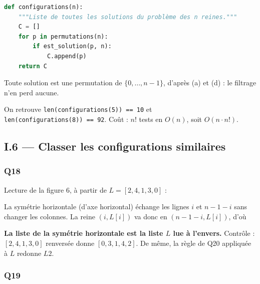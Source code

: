 \documentclass[11pt,a4paper]{article}
\newcommand{\equationajustee}[1]{%
  \sbox{\boiteequation}{$\displaystyle #1$}%
  \ifdim\wd\boiteequation>\linewidth
    \[\resizebox{\linewidth}{!}{\usebox{\boiteequation}}\]%
  \else
    \[#1\]%
  \fi}
\begin{document}
\begin{lstlisting}[language=Python]
def configurations(n):
    """Liste de toutes les solutions du problème des n reines."""
    C = []
    for p in permutations(n):
        if est_solution(p, n):
            C.append(p)
    return C
\end{lstlisting}

Toute solution est une permutation de \(\{0, \dots, n-1\}\), d'après (a) et (d) : le filtrage n'en perd aucune.

On retrouve \texttt{len(\allowbreak{}configurations(\allowbreak{}5)\allowbreak{})\allowbreak{}\ =\allowbreak{}=\allowbreak{}\ 10} et \texttt{len(\allowbreak{}configurations(\allowbreak{}8)\allowbreak{})\allowbreak{}\ =\allowbreak{}=\allowbreak{}\ 92}. Coût : \(n!\) tests en \(O(n)\), soit \(O(n \cdot n!)\).

\hypertarget{i.6-classer-les-configurations-similaires}{%
\subsection{I.6 --- Classer les configurations similaires}\label{i.6-classer-les-configurations-similaires}}

\hypertarget{q18}{%
\subsubsection{Q18}\label{q18}}

Lecture de la figure 6, à partir de \(L = [2, 4, 1, 3, 0]\) :

\equationajustee{\boxed{\begin{aligned}
L1 &= [0, 3, 1, 4, 2] \\
L2 &= [0, 2, 4, 1, 3]
\end{aligned}}}

La symétrie horizontale (d'axe horizontal) échange les lignes \(i\) et \(n - 1 - i\) sans changer les colonnes. La reine \((i, L[i])\) va donc en \((n-1-i, L[i])\), d'où

\equationajustee{\boxed{L1[i] = L[n-1-i] \text{ pour tout } i}}

\textbf{La liste de la symétrie horizontale est la liste \(L\) lue à l'envers.} Contrôle : \([2, 4, 1, 3, 0]\) renversée donne \([0, 3, 1, 4, 2]\). De même, la règle de Q20 appliquée à \(L\) redonne \(L2\).

\hypertarget{q19}{%
\subsubsection{Q19}\label{q19}}
\end{document}
